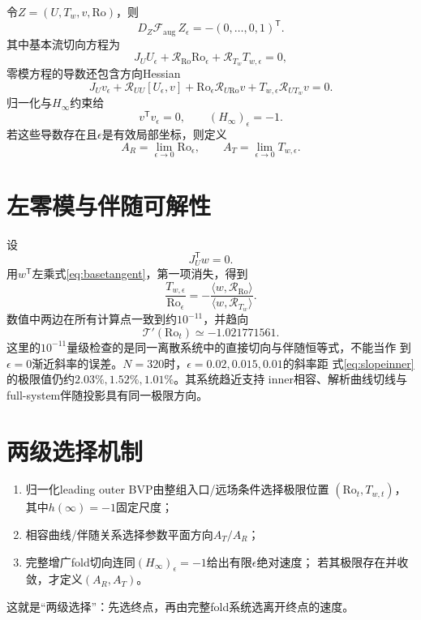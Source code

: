 \documentclass[UTF8,zihao=-4,openany]{ctexbook}
\newcommand{\eps}{\epsilon}
\newcommand{\Ro}{\mathrm{Ro}}
\newcommand{\R}{\mathcal R}
\newcommand{\Tcurve}{\mathcal T}
\begin{document}
令$Z=(U,T_w,v,\Ro)$，则
\begin{equation}
 D_Z\mathcal F_{\mathrm{aug}}\,Z_\eps=-(0,\ldots,0,1)^\mathsf{T}.
\end{equation}
其中基本流切向方程为
\begin{equation}\label{eq:basetangent}
 J_UU_\eps+\R_\Ro\Ro_\eps+\R_{T_w}T_{w,\eps}=0,
\end{equation}
零模方程的导数还包含方向Hessian
\begin{equation}
 J_Uv_\eps+\R_{UU}[U_\eps,v]
 +\Ro_\eps\R_{U\Ro}v+T_{w,\eps}\R_{UT_w}v=0.
\end{equation}
归一化与$H_\infty$约束给
\begin{equation}
 v^\mathsf{T}v_\eps=0,\qquad (H_\infty)_\eps=-1.
\end{equation}
若这些导数存在且$\eps$是有效局部坐标，则定义
\begin{equation}
 A_R=\lim_{\eps\to0}\Ro_\eps,\qquad
 A_T=\lim_{\eps\to0}T_{w,\eps}.
\end{equation}

\section{左零模与伴随可解性}

设
\begin{equation}
 J_U^\mathsf{T}w=0.
\end{equation}
用$w^\mathsf{T}$左乘式\eqref{eq:basetangent}，第一项消失，得到
\begin{equation}\label{eq:adjointslope}
 \boxed{
 \frac{T_{w,\eps}}{\Ro_\eps}
 =-\frac{\langle w,\R_\Ro\rangle}{\langle w,\R_{T_w}\rangle}.}
\end{equation}
数值中两边在所有计算点一致到约$10^{-11}$，并趋向
\begin{equation}
 \Tcurve'(\Ro_t)\simeq-1.021771561.
\end{equation}
这里的$10^{-11}$量级检查的是同一离散系统中的直接切向与伴随恒等式，不能当作
到$\eps=0$渐近斜率的误差。$N=320$时，$\eps=0.02,0.015,0.01$的斜率距
式\eqref{eq:slopeinner}的极限值仍约$2.03\%,1.52\%,1.01\%$。其系统趋近支持
inner相容、解析曲线切线与full-system伴随投影具有同一极限方向。

\section{两级选择机制}

\begin{keyresult}
\begin{enumerate}
 \item 归一化leading outer BVP由整组入口/远场条件选择极限位置
 $(\Ro_t,T_{w,t})$，其中$h(\infty)=-1$固定尺度；
 \item 相容曲线/伴随关系选择参数平面方向$A_T/A_R$；
 \item 完整增广fold切向连同$(H_\infty)_\eps=-1$给出有限$\eps$绝对速度；
 若其极限存在并收敛，才定义$(A_R,A_T)$。
\end{enumerate}
这就是“两级选择”：先选终点，再由完整fold系统选离开终点的速度。
\end{keyresult}
\end{document}
